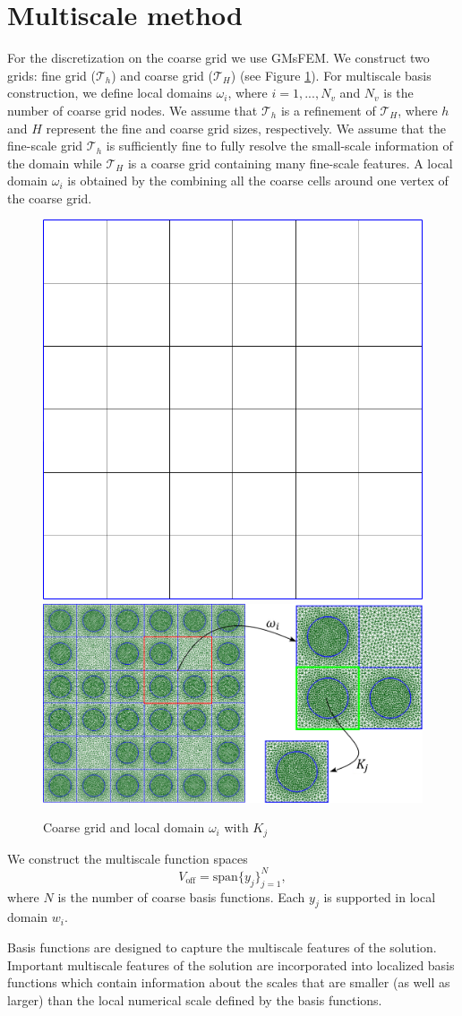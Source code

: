 \documentclass[authoryear]{elsarticle}
\begin{document}
\section{Multiscale method}
For the discretization on the coarse grid we use GMsFEM.
We construct two grids: fine grid ($\mathcal{T}_h$) and coarse grid ($\mathcal{T}_H$) (see Figure \ref{p1}).
For multiscale basis construction, we define local domains $\omega_i$, where $i = 1,..., N_v$ and $N_v$ is the number of coarse grid nodes.
We assume that $\mathcal{T}_h$ is a refinement of $\mathcal{T}_H$, where $h$ and $H$ represent the fine and coarse grid sizes, respectively. 
We assume that the fine-scale grid $\mathcal{T}_h$ is sufficiently fine to fully resolve the small-scale information of the domain  while $\mathcal{T}_H$ is a coarse grid containing many fine-scale features.
A local domain $\omega_i$ is obtained by the combining all the coarse cells around one vertex of the coarse grid. 

\begin{figure}[h]
	\centering
		\includegraphics[width=0.3\linewidth]{coarse_grid.png} \hspace{2em}
		\includegraphics[width=0.57\linewidth]{omega.png} 
	\caption{Coarse grid and local domain $\omega_i$ with $K_j$}
	\label{p1}
\end{figure} 

We construct the multiscale function spaces
\[
	{V}_{\text{off}} = \mbox{span} \{y_{j}\}_{j=1}^{N},
\]
where $N$ is the number of coarse basis functions.
Each $y_j$ is supported in local domain $w_i$.

Basis functions are designed to capture the multiscale features of the solution. 
Important multiscale features of the solution are incorporated into localized basis functions which contain information about the scales that are smaller (as well as larger) than the local numerical scale defined by the basis functions. 
\end{document}
